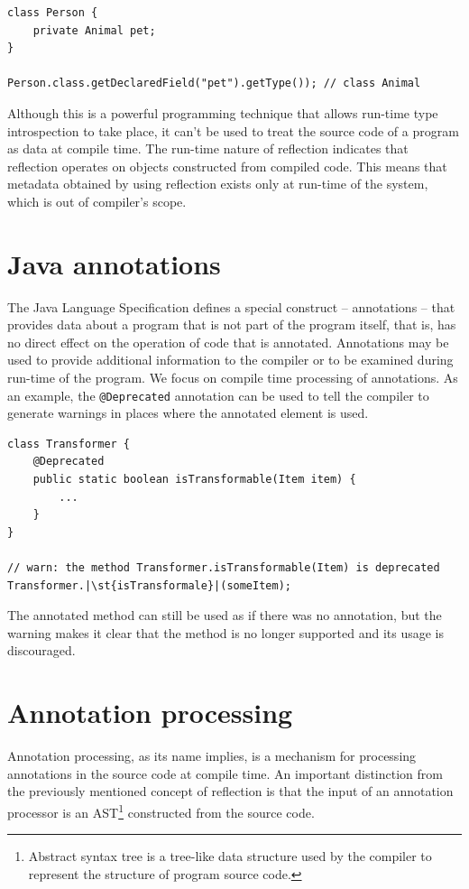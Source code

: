 \begin{verbatim}
class Person {
    private Animal pet;
}

Person.class.getDeclaredField("pet").getType()); // class Animal
\end{verbatim}

Although this is a powerful programming technique that allows run-time type introspection to take place, it can’t be used to treat the source code of a program as data at compile time.
The run-time nature of reflection indicates that reflection operates on objects constructed from compiled code.
This means that metadata obtained by using reflection exists only at run-time of the system, which is out of compiler's scope.

\section{Java annotations}
The Java Language Specification defines a special construct – annotations – that provides data about a program that is not part of the program itself, that is, has no direct effect on the operation of code that is annotated.
Annotations may be used to provide additional information to the compiler or to be examined during run-time of the program.
We focus on compile time processing of annotations.
As an example, the \texttt{@Deprecated} annotation can be used to tell the compiler to generate warnings in places where the annotated element is used.

\begin{verbatim}
class Transformer {
    @Deprecated
    public static boolean isTransformable(Item item) {
        ...
    }
}

// warn: the method Transformer.isTransformable(Item) is deprecated
Transformer.|\st{isTransformale}|(someItem);
\end{verbatim}

The annotated method can still be used as if there was no annotation, but the warning makes it clear that the method is no longer supported and its usage is discouraged.

\section{Annotation processing}
Annotation processing, as its name implies, is a mechanism for processing annotations in the source code at compile time. An important distinction from the previously mentioned concept of reflection is that the input of an annotation processor is an AST\footnote{Abstract syntax tree is a tree-like data structure used by the compiler to represent the structure of program source code.} constructed from the source code.

